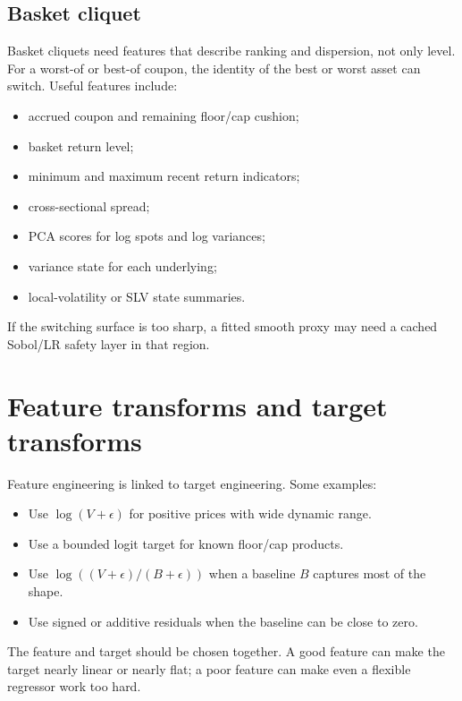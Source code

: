 \documentclass[11pt,oneside]{book}
\theoremstyle{definition}
\begin{document}
\subsection{Basket cliquet}
Basket cliquets need features that describe ranking and dispersion, not only
level. For a worst-of or best-of coupon, the identity of the best or worst
asset can switch. Useful features include:
\begin{itemize}
  \item accrued coupon and remaining floor/cap cushion;
  \item basket return level;
  \item minimum and maximum recent return indicators;
  \item cross-sectional spread;
  \item PCA scores for log spots and log variances;
  \item variance state for each underlying;
  \item local-volatility or SLV state summaries.
\end{itemize}
If the switching surface is too sharp, a fitted smooth proxy may need a cached
Sobol/LR safety layer in that region.

\section{Feature transforms and target transforms}
Feature engineering is linked to target engineering. Some examples:
\begin{itemize}
  \item Use \(\log(V+\epsilon)\) for positive prices with wide dynamic range.
  \item Use a bounded logit target for known floor/cap products.
  \item Use \(\log((V+\epsilon)/(B+\epsilon))\) when a baseline \(B\) captures
        most of the shape.
  \item Use signed or additive residuals when the baseline can be close to
        zero.
\end{itemize}
The feature and target should be chosen together. A good feature can make the
target nearly linear or nearly flat; a poor feature can make even a flexible
regressor work too hard.
\end{document}
